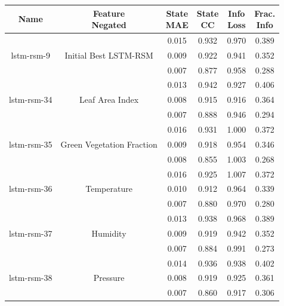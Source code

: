 \begin{table}[H]
\centering
    \begin{tabular}{c|c|c|c|c|c }
    \small
Name & \thead{Feature \\ Negated} &  \thead{State\\MAE} & \thead{State\\CC} & \thead{Info\\Loss} &\thead{Frac.\\Info}\\
\hline
\multirow{3}{6em}{lstm-rsm-9} & \multirow{3}{8em}{Initial Best LSTM-RSM} & 0.015 & 0.932 & 0.970 & 0.389 \\ & & 0.009 & 0.922 & 0.941 & 0.352 \\ & & 0.007 & 0.877 & 0.958 & 0.288 \\
\hline
\multirow{3}{6em}{lstm-rsm-34} & \multirow{3}{8em}{Leaf Area Index} & 0.013 & 0.942 & 0.927 & 0.406 \\ & & 0.008 & 0.915 & 0.916 & 0.364 \\ & & 0.007 & 0.888 & 0.946 & 0.294 \\
\hline
\multirow{3}{6em}{lstm-rsm-35} & \multirow{3}{8em}{Green Vegetation Fraction} & 0.016 & 0.931 & 1.000 & 0.372 \\ & & 0.009 & 0.918 & 0.954 & 0.346 \\ & & 0.008 & 0.855 & 1.003 & 0.268 \\
\hline
\multirow{3}{6em}{lstm-rsm-36} & \multirow{3}{8em}{Temperature} & 0.016 & 0.925 & 1.007 & 0.372 \\ & & 0.010 & 0.912 & 0.964 & 0.339 \\ & & 0.007 & 0.880 & 0.970 & 0.280 \\
\hline
\multirow{3}{6em}{lstm-rsm-37} & \multirow{3}{8em}{Humidity} & 0.013 & 0.938 & 0.968 & 0.389 \\ & & 0.009 & 0.919 & 0.942 & 0.352 \\ & & 0.007 & 0.884 & 0.991 & 0.273 \\
\hline
\multirow{3}{6em}{lstm-rsm-38} & \multirow{3}{8em}{Pressure} & 0.014 & 0.936 & 0.938 & 0.402 \\ & & 0.008 & 0.919 & 0.925 & 0.361 \\ & & 0.007 & 0.860 & 0.917 & 0.306 \\
\hline

\end{tabular}
\end{table}
